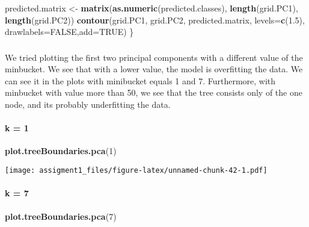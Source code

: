 \documentclass[
]{article}
\newenvironment{Shaded}{\begin{snugshade}}{\end{snugshade}}
\newcommand{\DataTypeTok}[1]{\textcolor[rgb]{0.13,0.29,0.53}{#1}}
\newcommand{\DecValTok}[1]{\textcolor[rgb]{0.00,0.00,0.81}{#1}}
\newcommand{\FloatTok}[1]{\textcolor[rgb]{0.00,0.00,0.81}{#1}}
\newcommand{\KeywordTok}[1]{\textcolor[rgb]{0.13,0.29,0.53}{\textbf{#1}}}
\newcommand{\NormalTok}[1]{#1}
\newcommand{\OtherTok}[1]{\textcolor[rgb]{0.56,0.35,0.01}{#1}}
\newcommand{\StringTok}[1]{\textcolor[rgb]{0.31,0.60,0.02}{#1}}
\begin{document}
\begin{Shaded}
\begin{Highlighting}[]
\NormalTok{  predicted.matrix <-}\StringTok{ }\KeywordTok{matrix}\NormalTok{(}\KeywordTok{as.numeric}\NormalTok{(predicted.classes), }\KeywordTok{length}\NormalTok{(grid.PC1), }\KeywordTok{length}\NormalTok{(grid.PC2))}
  \KeywordTok{contour}\NormalTok{(grid.PC1, grid.PC2, predicted.matrix, }\DataTypeTok{levels=}\KeywordTok{c}\NormalTok{(}\FloatTok{1.5}\NormalTok{), }\DataTypeTok{drawlabels=}\OtherTok{FALSE}\NormalTok{,}\DataTypeTok{add=}\OtherTok{TRUE}\NormalTok{)}
\NormalTok{\}}
\end{Highlighting}
\end{Shaded}

\hypertarget{section-6}{%
\subsubsection{}\label{section-6}}

We tried plotting the first two principal components with a different
value of the minbucket. We see that with a lower value, the model is
overfitting the data. We can see it in the plots with minibucket equals
1 and 7. Furthermore, with minbucket with value more than 50, we see
that the tree consists only of the one node, and its probably
underfitting the data.

\hypertarget{k-1-1}{%
\paragraph{k = 1}\label{k-1-1}}

\begin{Shaded}
\begin{Highlighting}[]
\KeywordTok{plot.treeBoundaries.pca}\NormalTok{(}\DecValTok{1}\NormalTok{)}
\end{Highlighting}
\end{Shaded}

\texttt{[image: assigment1\_files/figure-latex/unnamed-chunk-42-1.pdf]}

\hypertarget{k-7-1}{%
\paragraph{k = 7}\label{k-7-1}}

\begin{Shaded}
\begin{Highlighting}[]
\KeywordTok{plot.treeBoundaries.pca}\NormalTok{(}\DecValTok{7}\NormalTok{)}
\end{Highlighting}
\end{Shaded}
\end{document}
